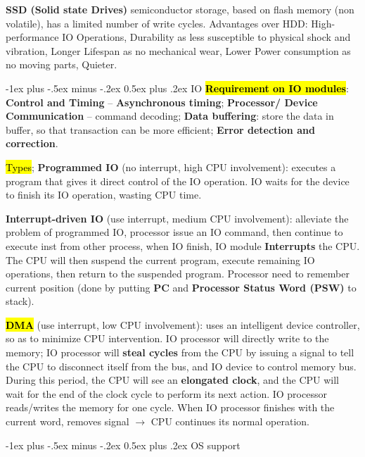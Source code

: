 \documentclass[a4paper]{article}
\makeatletter
\renewcommand{\section}{\@startsection{section}{1}{0mm}%
                                {-1ex plus -.5ex minus -.2ex}%
                                {0.5ex plus .2ex}%
                                {\normalfont\normalsize\bfseries}}
\makeatother
\begin{document}
\begin{multicols*}{2}
  \textbf{SSD (Solid state Drives)} semiconductor storage, based on flash memory (non volatile), has a limited number of write cycles. Advantages over HDD: High-performance IO Operations, Durability as less susceptible to physical shock and vibration, Longer Lifespan as no mechanical wear, Lower Power consumption as no moving parts, Quieter.

  \section{IO}
  \hl{\textbf{Requirement on IO modules}}: \textbf{Control and Timing} – \textbf{Asynchronous timing}; \textbf{Processor/ Device Communication} – command decoding; \textbf{Data buffering}: store the data in buffer, so that transaction can be more efficient; \textbf{Error detection and correction}.

  \hl{Types}; \textbf{Programmed IO} (no interrupt, high CPU involvement): executes a program that gives it direct control of the IO operation. IO waits for the device to finish its IO operation, wasting CPU time.

  \textbf{Interrupt-driven IO} (use interrupt, medium CPU involvement): alleviate the problem of programmed IO, processor issue an IO command, then continue to execute inst from other process, when IO finish, IO module \textbf{Interrupts} the CPU. The CPU will then suspend the current program, execute remaining IO operations, then return to the suspended program. Processor need to remember current position (done by putting \textbf{PC} and \textbf{Processor Status Word (PSW)} to stack).

  \hl{\textbf{DMA}} (use interrupt, low CPU involvement): uses an intelligent device controller, so as to minimize CPU intervention. IO processor will directly write to the memory; IO processor will \textbf{steal cycles} from the CPU by issuing a signal to tell the CPU to disconnect itself from the bus, and IO device to control memory bus. During this period, the CPU will see an \textbf{elongated clock}, and the CPU will wait for the end of the clock cycle to perform its next action. IO processor reads/writes the memory for one cycle. When IO processor finishes with the current word, removes signal $\to$ CPU continues its normal operation.

  \section{OS support}


\end{multicols*}
\end{document}
